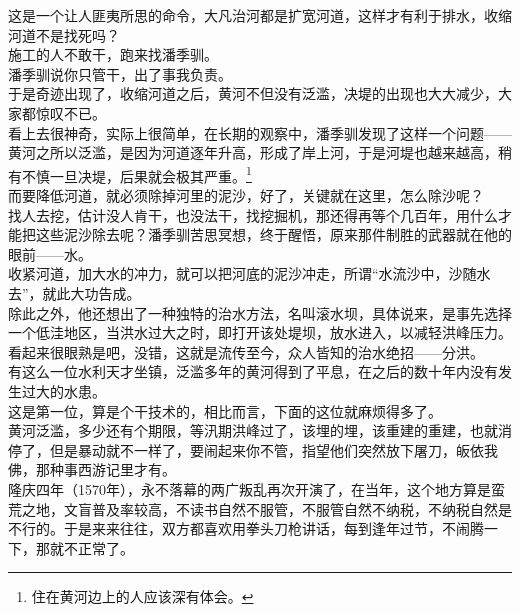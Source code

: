 \begin{multicols}{\theparacolNo}
这是一个让人匪夷所思的命令，大凡治河都是扩宽河道，这样才有利于排水，收缩河道不是找死吗？\\

施工的人不敢干，跑来找潘季驯。\\

潘季驯说你只管干，出了事我负责。\\

于是奇迹出现了，收缩河道之后，黄河不但没有泛滥，决堤的出现也大大减少，大家都惊叹不已。\\

看上去很神奇，实际上很简单，在长期的观察中，潘季驯发现了这样一个问题——黄河之所以泛滥，是因为河道逐年升高，形成了岸上河，于是河堤也越来越高，稍有不慎一旦决堤，后果就会极其严重。\footnote{住在黄河边上的人应该深有体会。}\\

而要降低河道，就必须除掉河里的泥沙，好了，关键就在这里，怎么除沙呢？\\

找人去挖，估计没人肯干，也没法干，找挖掘机，那还得再等个几百年，用什么才能把这些泥沙除去呢？潘季驯苦思冥想，终于醒悟，原来那件制胜的武器就在他的眼前——水。\\

收紧河道，加大水的冲力，就可以把河底的泥沙冲走，所谓“水流沙中，沙随水去”，就此大功告成。\\

除此之外，他还想出了一种独特的治水方法，名叫滚水坝，具体说来，是事先选择一个低洼地区，当洪水过大之时，即打开该处堤坝，放水进入，以减轻洪峰压力。\\

看起来很眼熟是吧，没错，这就是流传至今，众人皆知的治水绝招——分洪。\\

有这么一位水利天才坐镇，泛滥多年的黄河得到了平息，在之后的数十年内没有发生过大的水患。\\

这是第一位，算是个干技术的，相比而言，下面的这位就麻烦得多了。\\

黄河泛滥，多少还有个期限，等汛期洪峰过了，该埋的埋，该重建的重建，也就消停了，但是暴动就不一样了，要闹起来你不管，指望他们突然放下屠刀，皈依我佛，那种事西游记里才有。\\

隆庆四年（1570年），永不落幕的两广叛乱再次开演了，在当年，这个地方算是蛮荒之地，文盲普及率较高，不读书自然不服管，不服管自然不纳税，不纳税自然是不行的。于是来来往往，双方都喜欢用拳头刀枪讲话，每到逢年过节，不闹腾一下，那就不正常了。\\


\end{multicols}
